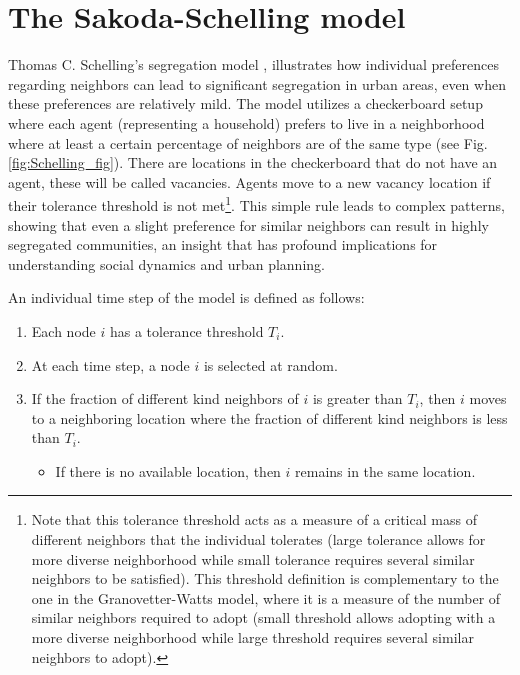 \section{\label{sec:The Sakoda-Schelling model} The Sakoda-Schelling model}

Thomas C. Schelling's segregation model \cite{schelling-1969}, illustrates how individual preferences regarding neighbors can lead to significant segregation in urban areas, even when these preferences are relatively mild. The model utilizes a checkerboard setup where each agent (representing a household) prefers to live in a neighborhood where at least a certain percentage of neighbors are of the same type (see Fig. \ref{fig:Schelling_fig}). There are locations in the checkerboard that do not have an agent, these will be called vacancies. Agents move to a new vacancy location if their tolerance threshold is not met\footnote{\sffamily\small Note that this  tolerance threshold acts as a measure of a critical mass of different neighbors that the individual tolerates (large tolerance allows for more diverse neighborhood while small tolerance requires several similar neighbors to be satisfied). This threshold definition is complementary to the one in the Granovetter-Watts model, where it is a measure of the number of similar neighbors required to adopt (small threshold allows adopting with a more diverse neighborhood while large threshold requires several similar neighbors to adopt).}. This simple rule leads to complex patterns, showing that even a slight preference for similar neighbors can result in highly segregated communities, an insight that has profound implications for understanding social dynamics and urban planning. 
\pagebreak

\begin{theorem}
    \sffamily\small
    An individual time step of the model is defined as follows:
    \begin{enumerate}
        \item Each node $i$ has a tolerance threshold $T_i$.
        \item At each time step, a node $i$ is selected at random.
        \item If the fraction of different kind neighbors of $i$ is greater than $T_i$, then $i$ moves to a neighboring location where the fraction of different kind neighbors is less than $T_i$.
            \begin{itemize}
                \item If there is no available location, then $i$ remains in the same location.
            \end{itemize}
    \end{enumerate}
\end{theorem}

